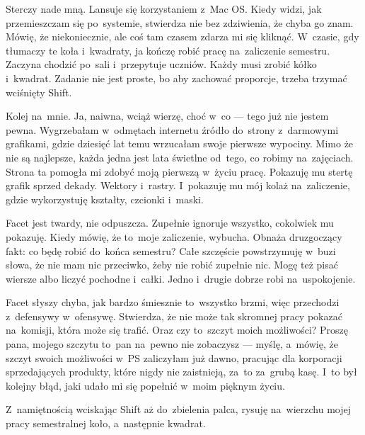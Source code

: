 \documentclass[9pt, a5paper]{memoir}
\begin{document}
Sterczy nade mną. Lansuje się korzystaniem z~Mac OS. Kiedy widzi, jak przemieszczam się po~systemie, stwierdza nie bez zdziwienia, że chyba go znam. Mówię, że niekoniecznie, ale coś tam czasem zdarza mi się kliknąć. W~czasie, gdy tłumaczy te koła i~kwadraty, ja kończę robić pracę na~zaliczenie semestru. Zaczyna chodzić po~sali i~przepytuje uczniów. Każdy musi zrobić kółko i~kwadrat. Zadanie nie jest proste, bo aby zachować proporcje, trzeba trzymać wciśnięty Shift.

Kolej na~mnie. Ja, naiwna, wciąż wierzę, choć w~co --- tego już nie jestem pewna. Wygrzebałam w~odmętach internetu źródło do~strony z~darmowymi grafikami, gdzie dziesięć lat temu wrzucałam swoje pierwsze wypociny. Mimo że nie są najlepsze, każda jedna jest lata świetlne od~tego, co robimy na~zajęciach. Strona ta pomogła mi zdobyć moją pierwszą w~życiu pracę. Pokazuję mu stertę grafik sprzed dekady. Wektory i~rastry. I~pokazuję mu mój kolaż na~zaliczenie, gdzie wykorzystuję kształty, czcionki i~maski.

Facet jest twardy, nie odpuszcza. Zupełnie ignoruje wszystko, cokolwiek mu pokazuję. Kiedy mówię, że to~moje zaliczenie, wybucha. Obnaża druzgoczący fakt: co będę robić do~końca semestru? Całe szczęście powstrzymuję w~buzi słowa, że nie mam nic przeciwko, żeby nie robić zupełnie nic. Mogę też pisać wiersze albo liczyć pochodne i~całki. Jedno i~drugie dobrze robi na~uspokojenie.

Facet słyszy chyba, jak bardzo śmiesznie to~wszystko brzmi, więc przechodzi z~defensywy w~ofensywę. Stwierdza, że nie może tak skromnej pracy pokazać na~komisji, która może się trafić. Oraz czy to~szczyt moich możliwości? Proszę pana, mojego szczytu to~pan na~pewno nie zobaczysz --- myślę, a~mówię, że szczyt swoich możliwości w~PS zaliczyłam już dawno, pracując dla korporacji sprzedających produkty, które nigdy nie zaistnieją, za~to za~grubą kasę. I~to był kolejny błąd, jaki udało mi się popełnić w~moim pięknym życiu.

Z~namiętnością wciskając Shift aż do~zbielenia palca, rysuję na~wierzchu mojej pracy semestralnej koło, a~następnie kwadrat.

\newpage
\end{document}
